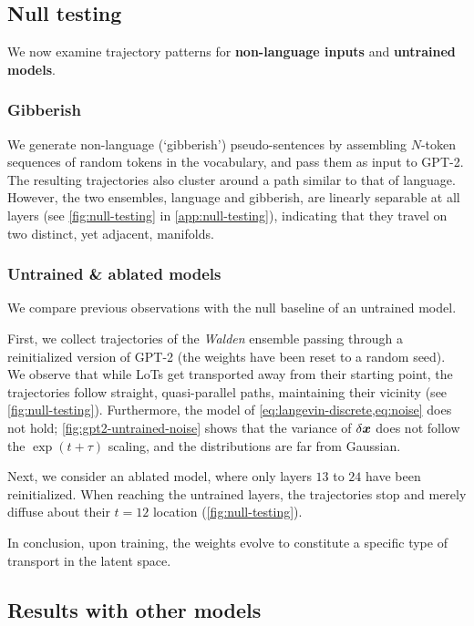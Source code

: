 \documentclass{article} %
\begin{document}
\subsection{Null testing}
We now examine trajectory patterns for \textbf{non-language inputs} and \textbf{untrained models}.

\subsubsection{Gibberish}
We generate non-language (`gibberish') pseudo-sentences by assembling $N$-token sequences of random tokens in the vocabulary, and pass them as input to GPT-2.
The resulting trajectories also cluster around a path similar to that of language.
However, the two ensembles, language and gibberish, are linearly separable at all layers (see \cref{fig:null-testing} in \cref{app:null-testing}), indicating that they travel on two distinct, yet adjacent, manifolds.

\subsubsection{Untrained \& ablated models}
We compare previous observations with the null baseline of an untrained model.

First, we collect trajectories of the \textit{Walden} ensemble passing through a reinitialized version of GPT-2 (the weights have been reset to a random seed).
We observe that while LoTs get transported away from their starting point, the trajectories follow straight, quasi-parallel paths, maintaining their vicinity (see \cref{fig:null-testing}).
Furthermore, the model of \cref{eq:langevin-discrete,eq:noise} does not hold; \cref{fig:gpt2-untrained-noise} shows that the variance of $\delta {\bm{x}}$ does not follow the $\exp(t+\tau)$ scaling, and the distributions are far from Gaussian.

Next, we consider an ablated model, where only layers $13$ to $24$ have been reinitialized.
When reaching the untrained layers, the trajectories stop and merely diffuse about their $t=12$ location (\cref{fig:null-testing}).

In conclusion, upon training, the weights evolve to constitute a specific type of transport in the latent space.



\subsection{Results with other models} 
\label{sec:other-models}
\end{document}
